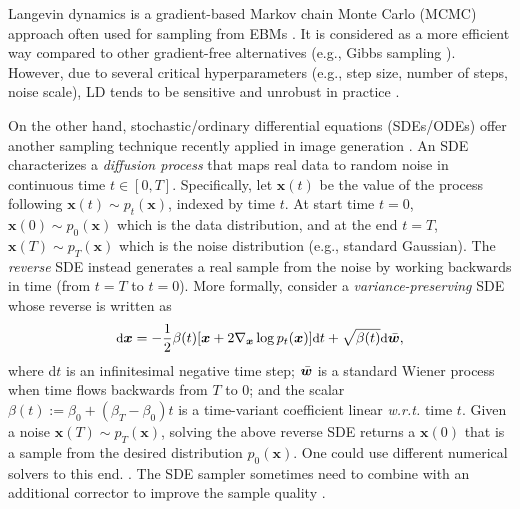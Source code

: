 \documentclass[11pt]{article}
\begin{document}
Langevin dynamics \cite[LD,][]{DBLP:conf/icml/WellingT11,DBLP:journals/corr/abs-1811-08413} is a gradient-based Markov chain Monte Carlo (MCMC) approach often used for sampling from EBMs \citep{DBLP:conf/nips/DuM19,DBLP:conf/nips/SongE19,DBLP:journals/corr/abs-2004-06030,QinCOLD}. It is considered as a more efficient way compared to other gradient-free alternatives (e.g., Gibbs sampling \citep{bishop2006pattern}). However, due to several critical hyperparameters (e.g., step size, number of steps, noise scale), LD tends to be sensitive and unrobust in practice \citep{nie2021controllable,DBLP:journals/corr/abs-1903-08689,DBLP:conf/iclr/GrathwohlWJD0S20}. 

On the other hand, stochastic/ordinary differential equations (SDEs/ODEs) \cite{anderson1982reverse} offer another sampling technique recently applied in image generation \citep{DBLP:conf/iclr/0011SKKEP21,nie2021controllable}. An SDE characterizes a \emph{diffusion process} that maps real data to random noise in continuous time $t\in[0, T]$. Specifically, let $\bm{x}(t)$ be the value of the process following $\bm{x}(t)\sim p_t(\bm{x})$, indexed by time $t$. At start time $t=0$, $\bm{x}(0)\sim p_0(\bm{x})$ which is the data distribution, and at the end $t=T$, $\bm{x}(T)\sim p_T(\bm{x})$ which is the noise distribution (e.g., standard Gaussian). The \emph{reverse} SDE instead generates a real sample from the noise by working backwards in time (from $t=T$ to $t=0$). More formally, consider a {\it variance-preserving} SDE \citep{DBLP:conf/iclr/0011SKKEP21} whose reverse is written as
\begin{equation}
\small
\setlength\abovedisplayskip{0.2cm}
\setlength\belowdisplayskip{0.2cm}
\label{eq:sde}
    \text{d}\bm x=-\frac{1}{2}\beta(t)[\bm x+2\nabla_{\bm x}\log p_t(\bm x)]\text{d}t + \sqrt{\beta(t)}\text{d}\Bar{\bm w},
\end{equation}
where d$t$ is an infinitesimal negative time step; $\Bar{\bm w}$ is a standard Wiener process when time flows backwards from $T$ to $0$; and the scalar $\beta(t):=\beta_0 + (\beta_T - \beta_0)t$ is a time-variant coefficient linear \emph{w.r.t.} time $t$. Given a noise $\bm{x}(T)\sim p_T(\bm{x})$, solving the above reverse SDE returns a $\bm{x}(0)$ that is a sample from the desired distribution $p_0(\bm{x})$. One could use different numerical solvers to this end.
\cite{burrage2000numerical, higham2001algorithmic,rossler2009second}. 
The SDE sampler sometimes need to combine with an additional corrector to improve the sample quality \citep{DBLP:conf/iclr/0011SKKEP21}.
\end{document}
